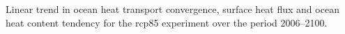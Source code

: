 \label{fig:noresm_full}
Linear trend in ocean heat transport convergence, surface heat flux and ocean heat content tendency for the rcp85 experiment over the period 2006--2100.